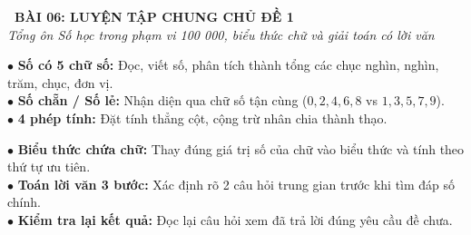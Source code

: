 \documentclass[14pt,a4paper,oneside]{extbook}
\begin{document}
\noindent
\begin{tcolorbox}[
  enhanced,
  colback=teal!8!white,
  colframe=teal!80!black,
  arc=3mm, boxrule=1pt,
  left=3mm, right=3mm, top=2mm, bottom=2mm,
  halign=center
]
  {\Large\bfseries\color{teal!90!black}\faBookmark\ BÀI 06: LUYỆN TẬP CHUNG CHỦ ĐỀ 1}\\[1.5pt]
  {\footnotesize\itshape\color{black!75} Tổng ôn Số học trong phạm vi 100 000, biểu thức chữ và giải toán có lời văn}
\end{tcolorbox}

\vspace{2.5mm}

\noindent
\begin{minipage}[t]{0.49\textwidth}
  \begin{tcolorbox}[
    enhanced,
    title={\footnotesize\bfseries\color{white}\faBook\ 1. Trọng tâm Số học \& Phép tính},
    colback=blue!2!white,
    colframe=blue!75!black,
    arc=2.5mm, boxrule=0.8pt, top=1.8mm, bottom=1.8mm, left=2mm, right=2mm
  ]
    \footnotesize
    $\bullet$ \textbf{Số có 5 chữ số:} Đọc, viết số, phân tích thành tổng các chục nghìn, nghìn, trăm, chục, đơn vị.\\
    $\bullet$ \textbf{Số chẵn / Số lẻ:} Nhận diện qua chữ số tận cùng ($0,2,4,6,8$ vs $1,3,5,7,9$).\\
    $\bullet$ \textbf{4 phép tính:} Đặt tính thẳng cột, cộng trừ nhân chia thành thạo.
  \end{tcolorbox}
\end{minipage}%
\hfill
\begin{minipage}[t]{0.49\textwidth}
  \begin{tcolorbox}[
    enhanced,
    title={\footnotesize\bfseries\color{white}\faTasks\ 2. Biểu thức \& Giải toán},
    colback=teal!2!white,
    colframe=teal!75!black,
    arc=2.5mm, boxrule=0.8pt, top=1.8mm, bottom=1.8mm, left=2mm, right=2mm
  ]
    \footnotesize
    $\bullet$ \textbf{Biểu thức chứa chữ:} Thay đúng giá trị số của chữ vào biểu thức và tính theo thứ tự ưu tiên.\\
    $\bullet$ \textbf{Toán lời văn 3 bước:} Xác định rõ 2 câu hỏi trung gian trước khi tìm đáp số chính.\\
    $\bullet$ \textbf{Kiểm tra lại kết quả:} Đọc lại câu hỏi xem đã trả lời đúng yêu cầu đề chưa.
  \end{tcolorbox}
\end{minipage}

\vspace{2.5mm}
\end{document}
